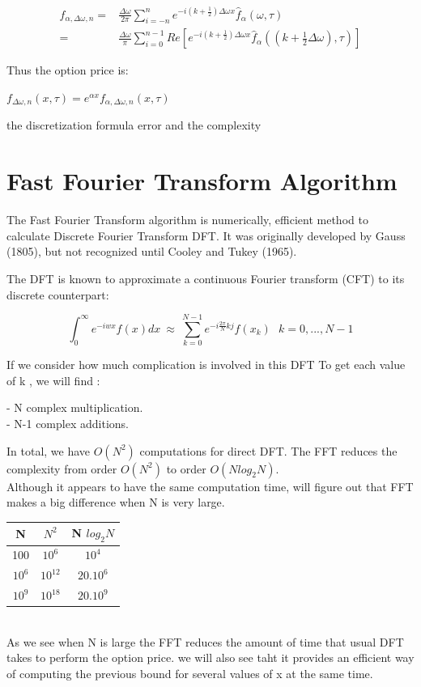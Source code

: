 \documentclass[12pt]{report}
\begin{document}
\begin{align}
f_{\alpha,\Delta \omega, n}=&\frac{\Delta \omega}{2\pi} \sum \limits_{i=-n}^n e^{-i(k+\frac{1}{2}) \Delta \omega x }\hat{f}_{\alpha}(\omega,\tau)
\\
=& \frac{\Delta \omega}{\pi} \sum \limits_{i=0}^{n-1} Re[e^{-i(k+\frac{1}{2}) \Delta \omega x }\hat{f}_{\alpha}((k+\frac{1}{2}\Delta\omega ),\tau)]
\end{align}

Thus the option price is: 
\begin{center}

$f_{\Delta \omega, n}(x,\tau)= e^{\alpha x}f_{\alpha,\Delta \omega, n}(x,\tau)$
\end{center}
the discretization formula  error and the complexity 


\section{Fast Fourier Transform Algorithm}
The Fast Fourier Transform algorithm is numerically, efficient method to calculate Discrete Fourier Transform DFT. It was originally developed by Gauss (1805), but not recognized until Cooley and Tukey (1965).

The DFT is known to approximate a continuous Fourier transform (CFT) to its discrete counterpart:

\begin{equation}
\int_{0}^{\infty} e^{-iwx}f(x) dx ~\approx ~ \sum \limits_{k=0}^{N-1} e^{-i \frac{2\pi}{N}kj} f(x_k)~~~ k=0,...,N-1
\end{equation}


If we consider how much complication is involved in this DFT To get each value of k , we will find :

- N complex multiplication.\\
- N-1 complex additions. 


In total, we have $O(N^2)$ computations for direct DFT. The FFT reduces the complexity from order  $O(N^2)$ to order $O(N log_2N)$.\\
 Although it appears to  have the same computation time, will figure out that FFT makes  a big difference when N is very large.
 \\

 \begin{tabular}{||c c c ||} 
 \hline
N & $N^2$ & N $log_2 N$ \\ [0.5ex] 
 \hline\hline
 100 & $10^6$ & $10^4$ \\ 
 \hline
 $10^6$ & $10^{12}$ & $20.10^6$ \\
 \hline
 $10^9$ & $10^{18}$ & $20.10^9$  \\
 \hline
 
\end{tabular}
\\

 As we see when N is large the FFT reduces the amount of time that usual DFT takes to perform the option price. we will also see taht it provides an efficient way of computing
the previous bound for several values of x at the same time.
 
\end{document}
